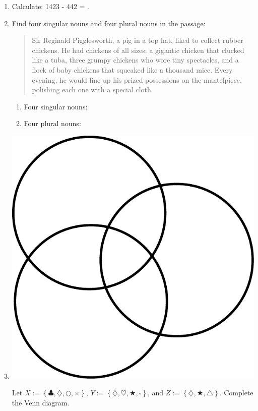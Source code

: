 \documentclass{tufte-book}
\begin{document}
\begin{enumerate}
  \item Calculate: 1423 - 442 = \dotfill.

  \item Find four singular nouns and four plural nouns in the passage:
  \begin{quote}
    Sir Reginald Pigglesworth, a pig in a top hat, liked to collect rubber chickens. He had chickens of all sizes: a gigantic chicken that clucked like a tuba, three grumpy chickens who wore tiny spectacles, and a flock of baby chickens that squeaked like a thousand mice. Every evening, he would line up his prized possessions on the mantelpiece, polishing each one with a special cloth.
  \end{quote}
  \begin{enumerate}\bigskip
    \item Four singular nouns: \dotfill\bigskip\par\dotfill\bigskip\par\dotfill\bigskip
    \item Four plural nouns: \dotfill\bigskip\par\dotfill\bigskip\par\dotfill
  \end{enumerate}

  \item \begin{marginfigure}\includegraphics[width=\textwidth]{maths/fig/venn_blank_3.pdf}\end{marginfigure}
  Let $X := \left\{\clubsuit, \diamondsuit, \bigcirc, \times\right\}$, $Y := \left\{\diamondsuit, \heartsuit, \bigstar, \square\right\}$, and $Z := \left\{\diamondsuit, \bigstar, \triangle\right\}$. Complete the Venn diagram.
\end{enumerate}
\end{document}
